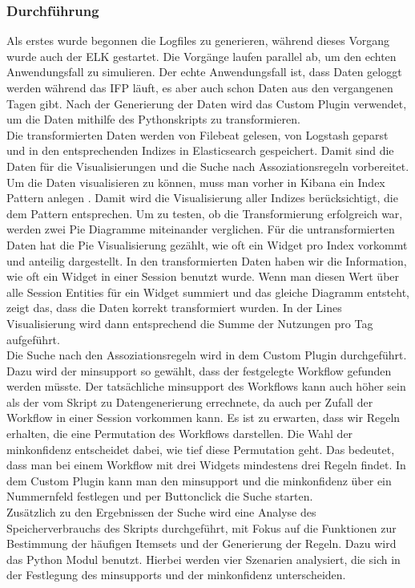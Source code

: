 \subsubsection{Durchführung}
\label{ssub:Durchführung}
Als erstes wurde begonnen die Logfiles zu generieren, während dieses Vorgang wurde auch der ELK gestartet. Die Vorgänge laufen parallel ab, um den echten Anwendungsfall zu simulieren. Der echte Anwendungsfall ist, dass Daten geloggt werden während das IFP läuft, es aber auch schon Daten aus den vergangenen Tagen gibt. Nach der Generierung der Daten wird das Custom Plugin verwendet, um die Daten mithilfe des Pythonskripts zu transformieren. \\
Die transformierten Daten werden von Filebeat gelesen, von Logstash geparst und in den entsprechenden Indizes in Elasticsearch gespeichert. Damit sind die Daten für die Visualisierungen und die Suche nach Assoziationsregeln vorbereitet. \\
Um die Daten visualisieren zu können, muss man vorher in Kibana ein Index Pattern anlegen \citep{KibIndexPatt20}. Damit wird die Visualisierung aller Indizes berücksichtigt, die dem Pattern entsprechen. Um zu testen, ob die Transformierung erfolgreich war, werden zwei Pie Diagramme miteinander verglichen. Für die untransformierten Daten hat die Pie Visualisierung gezählt, wie oft ein Widget pro Index vorkommt und anteilig dargestellt. In den transformierten Daten haben wir die Information, wie oft ein Widget in einer Session benutzt wurde. Wenn man diesen Wert über alle Session Entities für ein Widget summiert und das gleiche Diagramm entsteht, zeigt das, dass die Daten korrekt transformiert wurden. In der Lines Visualisierung wird dann entsprechend die Summe der Nutzungen pro Tag aufgeführt.\\
Die Suche nach den Assoziationsregeln wird in dem Custom Plugin durchgeführt. Dazu wird der minsupport so gewählt, dass der festgelegte Workflow gefunden werden müsste. Der tatsächliche minsupport des Workflows kann auch höher sein als der vom Skript zu Datengenerierung errechnete, da auch per Zufall der Workflow in einer Session vorkommen kann. Es ist zu erwarten, dass wir Regeln erhalten, die eine Permutation des Workflows darstellen. Die Wahl der minkonfidenz entscheidet dabei, wie tief diese Permutation geht. Das bedeutet, dass man bei einem Workflow mit drei Widgets mindestens drei Regeln findet. In dem Custom Plugin kann man den minsupport und die minkonfidenz über ein Nummernfeld festlegen und per Buttonclick die Suche starten.\\
Zusätzlich zu den Ergebnissen der Suche wird eine Analyse des Speicherverbrauchs des Skripts durchgeführt, mit Fokus auf die Funktionen zur Bestimmung der häufigen Itemsets und der Generierung der Regeln. Dazu wird das Python Modul \mbox{} \citep{PeGe20} benutzt. Hierbei werden vier Szenarien analysiert, die sich in der Festlegung des minsupports und der minkonfidenz unterscheiden.

